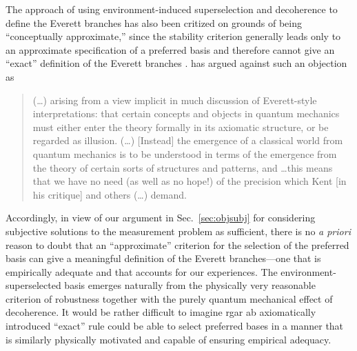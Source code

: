 \documentclass[rmp,aps,amsmath,amsfonts,noshowkeys,noshowpacs,12pt]{revtex4}
\begin{document}
The approach of using environment-induced superselection and
decoherence to define the Everett branches has also been critized on
grounds of being ``conceptually approximate,'' since the stability
criterion generally leads only to an approximate specification of a
preferred basis and therefore cannot give an ``exact'' definition of
the Everett branches \citetext{see, for example, the comments of
  \citealp{Zeh:1973:wq,Kent:1990:nm}, and also the well-known
  ``anti-FAPP'' position of \citealp{Bell:1982:ag}}.
\citet[pp.~90--91]{Wallace:2003:iz} has argued against such an
objection as
%
\begin{quote} {\small
    (\dots) arising from a view implicit in much discussion of
    Everett-style interpretations: that certain concepts and objects
    in quantum mechanics must either enter the theory formally in its
    axiomatic structure, or be regarded as illusion. (\dots) [Instead]
    the emergence of a classical world from quantum mechanics is to be
    understood in terms of the emergence from the theory of certain
    sorts of structures and patterns, and \dots this means that we have
    no need (as well as no hope!) of the precision which Kent [in his
    \citeyearpar{Kent:1990:nm} critique] and others (\dots) demand.}
\end{quote}
%
Accordingly, in view of our argument in Sec.~\ref{sec:objsubj} for
considering subjective solutions to the measurement problem as
sufficient, there is no {\em a priori} reason to doubt that an
``approximate'' criterion for the selection of the preferred basis can
give a meaningful definition of the Everett branches---one that is
empirically adequate and that accounts for our experiences. The
environment-superselected basis emerges naturally from the physically
very reasonable criterion of robustness together with the purely
quantum mechanical effect of decoherence. It would be rather difficult
to imagine rgar ab axiomatically introduced ``exact'' rule could be
able to select preferred bases in a manner that is similarly
physically motivated and capable of ensuring empirical adequacy.
\end{document}
